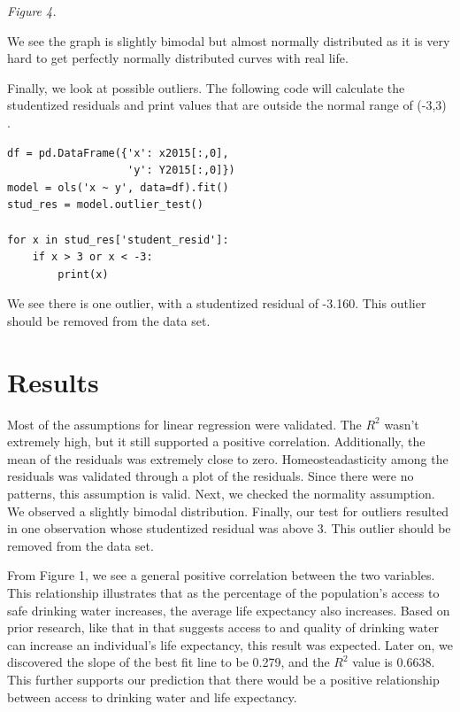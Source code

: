 \documentclass[12pt]{article}
\begin{document}
\begin{center}
\textit{Figure 4.}
\end{center}

\vspace{15pt}

\noindent
We see the graph is slightly bimodal but almost normally distributed as it is very hard to get perfectly normally distributed curves with real life.

\vspace{15pt}

\noindent
Finally, we look at possible outliers. The following code will calculate the studentized residuals and print values that are outside the normal range of (-3,3) \citep{statologyresiduals}.

\begin{lstlisting}
df = pd.DataFrame({'x': x2015[:,0],
                   'y': Y2015[:,0]})
model = ols('x ~ y', data=df).fit()
stud_res = model.outlier_test()

for x in stud_res['student_resid']:
    if x > 3 or x < -3:
        print(x)
\end{lstlisting}

\noindent
We see there is one outlier, with a studentized residual of -3.160. This outlier should be removed from the data set.

\section{Results}

\noindent
Most of the assumptions for linear regression were validated. The $R^2$ wasn't extremely high, but it still supported a positive correlation. Additionally, the mean of the residuals was extremely close to zero. Homeosteadasticity among the residuals was validated through a plot of the residuals. Since there were no patterns, this assumption is valid. Next, we checked the normality assumption. We observed a slightly bimodal distribution. Finally, our test for outliers resulted in one observation whose studentized residual was above 3. This outlier should be removed from the data set.

\vspace{15pt}

\noindent
From Figure 1, we see a general positive correlation between the two variables. This relationship illustrates that as the percentage of the population's access to safe drinking water increases, the average life expectancy also increases. Based on prior research, like that in \citet{angelakis2021quality} that suggests access to and quality of drinking water can increase an individual's life expectancy, this result was expected. Later on, we discovered the slope of the best fit line to be 0.279, and the $R^2$ value is 0.6638. This further supports our prediction that there would be a positive relationship between access to drinking water and life expectancy.
\end{document}
